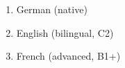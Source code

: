 \medskip\medskip


\begin{enumerate}
    \item German (native)
    \item English (bilingual, C2)
    \item French (advanced, B1+)
\end{enumerate}



\newpage









